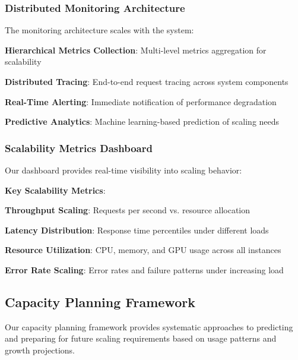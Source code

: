 \subsubsection*{Distributed Monitoring Architecture}

The monitoring architecture scales with the system:

\begin{expandedlist}
    \item \textbf{Hierarchical Metrics Collection}: Multi-level metrics aggregation for scalability
    \item \textbf{Distributed Tracing}: End-to-end request tracing across system components
    \item \textbf{Real-Time Alerting}: Immediate notification of performance degradation
    \item \textbf{Predictive Analytics}: Machine learning-based prediction of scaling needs
\end{expandedlist}

\subsubsection*{Scalability Metrics Dashboard}

Our dashboard provides real-time visibility into scaling behavior:

\begin{alertbox}
\textbf{Key Scalability Metrics}:
\begin{compactlist}
    \item \textbf{Throughput Scaling}: Requests per second vs. resource allocation
    \item \textbf{Latency Distribution}: Response time percentiles under different loads
    \item \textbf{Resource Utilization}: CPU, memory, and GPU usage across all instances
    \item \textbf{Error Rate Scaling}: Error rates and failure patterns under increasing load
\end{compactlist}
\end{alertbox}

\subsection*{Capacity Planning Framework}

Our capacity planning framework provides systematic approaches to predicting and preparing for future scaling requirements based on usage patterns and growth projections.

